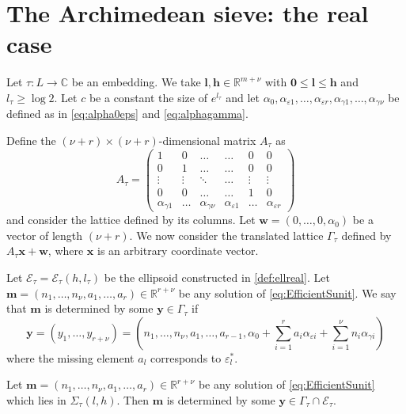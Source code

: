 \section{The Archimedean sieve: the real case}

Let $\tau:L\to\mathbb{C}$ be an embedding. We take $\mathbf{l},\mathbf{h} \in \mathbb{R}^{m+\nu}$ with $\mathbf{0}\leq \mathbf{l}\leq \mathbf{h}$ and $l_\tau\geq \log 2$. Let $c$ be a constant the size of $e^{l_\tau}$ and let $\alpha_0, \alpha_{\varepsilon 1}, \dots, \alpha_{\varepsilon {r}}, \alpha_{\gamma 1}, \dots, \alpha_{\gamma {\nu}}$ be defined as in \eqref{eq:alpha0eps} and \eqref{eq:alphagamma}. 

Define the $(\nu+r) \times (\nu +r)$-dimensional matrix $A_{\tau}$ as
\[A_{\tau} = \begin{pmatrix}
	1 & 0 & \dots &  \dots & 0 & 0\\ 
	0 & 1	& \dots & \dots & 0 & 0\\
	\vdots & \vdots & \ddots & \dots & \vdots & \vdots \\ 
	0 & 0 & \dots &  \dots & 1 & 0\\ 
	\alpha_{\gamma 1} & \dots &\alpha_{\gamma {\nu}} & \alpha_{\varepsilon 1} & \dots & \alpha_{\varepsilon {r}}
\end{pmatrix}\]
and consider the lattice defined by its columns. Let $\mathbf{w} = (0,\dotsc,0,\alpha_0)$ be a vector of length $(\nu + r)$. We now consider the translated lattice $\Gamma_{\tau}$ defined by $A_{\tau}\mathbf{x} + \mathbf{w}$, where $\mathbf{x}$ is an arbitrary coordinate vector. 
 
Let $\mathcal E_{\tau}=\mathcal E_{\tau}(h,l_{\tau})$ be the ellipsoid constructed in \eqref{def:ellreal}. Let ${\mathbf{m} = (n_1, \dots, n_{\nu}, a_1, \dots, a_r) \in \mathbb{R}^{r + \nu}}$ be any solution of \eqref{eq:EfficientSunit}. We say that $\mathbf{m}$ is determined by some $\mathbf{y} \in \Gamma_{\tau}$ if 
\[\mathbf{y} = (y_1, \dots, y_{r+ \nu}) = \left(n_1, \dots, n_{\nu}, a_1, \dots, a_{r-1}, \alpha_0+\sum_{i = 1}^r a_i \alpha_{\varepsilon i} + \sum_{i = 1}^{\nu} n_i \alpha_{\gamma i}\right)\]
where the missing element $a_{l}$ corresponds to $\varepsilon_l^*$.

\begin{lemma}\label{lem:archsieve}
Let ${\mathbf{m} = (n_1, \dots, n_{\nu}, a_1, \dots, a_r) \in \mathbb{R}^{r + \nu}}$ be any solution of \eqref{eq:EfficientSunit} which lies in $\Sigma_\tau(l,h)$. Then $\mathbf{m}$ is determined by some $\mathbf{y}\in \Gamma_\tau\cap\mathcal E_\tau.$
\end{lemma}

